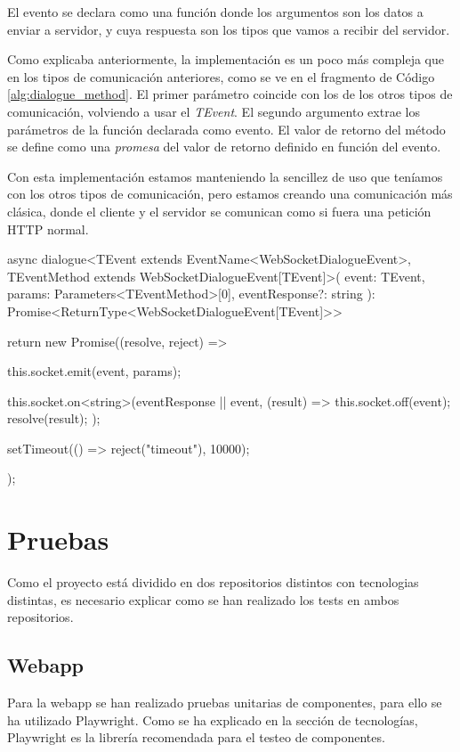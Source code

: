 El evento se declara como una función donde los argumentos son los datos a enviar a servidor, y cuya respuesta son los tipos que vamos a recibir del servidor.

Como explicaba anteriormente, la implementación es un poco más compleja que en los tipos de comunicación anteriores, como se ve en el fragmento de Código \ref{alg:dialogue_method}. El primer parámetro coincide con los de los otros tipos de comunicación, volviendo a usar el \textit{TEvent}. El segundo argumento extrae los parámetros de la función declarada como evento. El valor de retorno del método se define como una \textit{promesa} del valor de retorno definido en función del evento.

Con esta implementación estamos manteniendo la sencillez de uso que teníamos con los otros tipos de comunicación, pero estamos creando una comunicación más clásica, donde el cliente y el servidor se comunican como si fuera una petición HTTP normal.

\begin{mytypescript}[float={!t},caption={Implementación del método \textit{dialogue}.},label={alg:dialogue_method}]
	async dialogue<TEvent extends EventName<WebSocketDialogueEvent>, TEventMethod extends WebSocketDialogueEvent[TEvent]>(
	event: TEvent,
	params: Parameters<TEventMethod>[0],
	eventResponse?: string
	): Promise<ReturnType<WebSocketDialogueEvent[TEvent]>> {
		return new Promise((resolve, reject) => {
			this.socket.emit(event, params);

			this.socket.on<string>(eventResponse || event, (result) => {
				this.socket.off(event);
				resolve(result);
			});

			setTimeout(() => reject("timeout"), 10000);
		});
	}
\end{mytypescript}


\section{Pruebas}

Como el proyecto está dividido en dos repositorios distintos con tecnologias distintas, es necesario explicar como se han realizado los tests en ambos repositorios.

\subsection{Webapp}
Para la webapp se han realizado pruebas unitarias de componentes, para ello se ha utilizado Playwright. Como se ha explicado en la sección de tecnologías, Playwright es la librería recomendada para el testeo de componentes.

